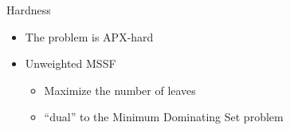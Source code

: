\begin{frame}{Hardness}
\begin{itemize}
	\item<1> The problem is APX-hard
	\item<2-4> Unweighted MSSF
	\begin{itemize}
	  \item<3> Maximize the number of leaves 
	  \item<4> ``dual'' to the Minimum Dominating Set problem
	\end{itemize}
\end{itemize}

\vfill

\centering


\end{frame}
